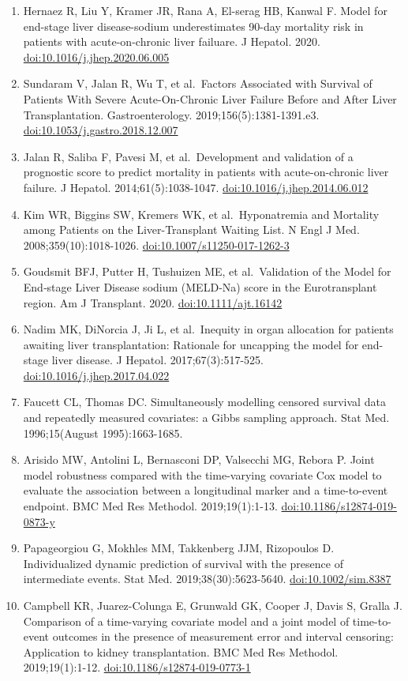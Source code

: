 \documentclass[11pt,english,]{book} %
\providecommand{\tightlist}{%
  \setlength{\itemsep}{0pt}\setlength{\parskip}{0pt}}
\begin{document}
\begin{enumerate}
\def\labelenumi{\arabic{enumi}.}
\tightlist
\item
  Hernaez R, Liu Y, Kramer JR, Rana A, El-serag HB, Kanwal F. Model for end-stage liver disease-sodium underestimates 90-day mortality risk in patients with acute-on-chronic liver failuare. J Hepatol. 2020. \url{doi:10.1016/j.jhep.2020.06.005}
\item
  Sundaram V, Jalan R, Wu T, et al.~Factors Associated with Survival of Patients With Severe Acute-On-Chronic Liver Failure Before and After Liver Transplantation. Gastroenterology. 2019;156(5):1381-1391.e3. \url{doi:10.1053/j.gastro.2018.12.007}
\item
  Jalan R, Saliba F, Pavesi M, et al.~Development and validation of a prognostic score to predict mortality in patients with acute-on-chronic liver failure. J Hepatol. 2014;61(5):1038-1047. \url{doi:10.1016/j.jhep.2014.06.012}
\item
  Kim WR, Biggins SW, Kremers WK, et al.~Hyponatremia and Mortality among Patients on the Liver-Transplant Waiting List. N Engl J Med. 2008;359(10):1018-1026. \url{doi:10.1007/s11250-017-1262-3}
\item
  Goudsmit BFJ, Putter H, Tushuizen ME, et al.~Validation of the Model for End‐stage Liver Disease sodium (MELD‐Na) score in the Eurotransplant region. Am J Transplant. 2020. \url{doi:10.1111/ajt.16142}
\item
  Nadim MK, DiNorcia J, Ji L, et al.~Inequity in organ allocation for patients awaiting liver transplantation: Rationale for uncapping the model for end-stage liver disease. J Hepatol. 2017;67(3):517-525. \url{doi:10.1016/j.jhep.2017.04.022}
\item
  Faucett CL, Thomas DC. Simultaneously modelling censored survival data and repeatedly measured covariates: a Gibbs sampling approach. Stat Med. 1996;15(August 1995):1663-1685.
\item
  Arisido MW, Antolini L, Bernasconi DP, Valsecchi MG, Rebora P. Joint model robustness compared with the time-varying covariate Cox model to evaluate the association between a longitudinal marker and a time-to-event endpoint. BMC Med Res Methodol. 2019;19(1):1-13. \url{doi:10.1186/s12874-019-0873-y}
\item
  Papageorgiou G, Mokhles MM, Takkenberg JJM, Rizopoulos D. Individualized dynamic prediction of survival with the presence of intermediate events. Stat Med. 2019;38(30):5623-5640. \url{doi:10.1002/sim.8387}
\item
  Campbell KR, Juarez-Colunga E, Grunwald GK, Cooper J, Davis S, Gralla J. Comparison of a time-varying covariate model and a joint model of time-to-event outcomes in the presence of measurement error and interval censoring: Application to kidney transplantation. BMC Med Res Methodol. 2019;19(1):1-12. \url{doi:10.1186/s12874-019-0773-1}
\end{enumerate}
\end{document}
